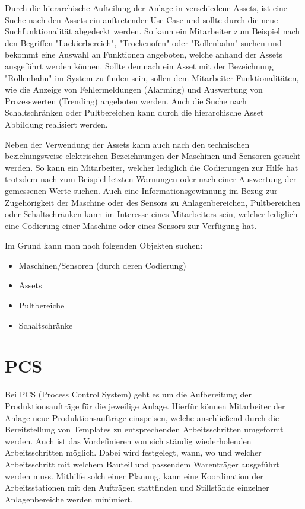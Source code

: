 Durch die hierarchische Aufteilung der Anlage in verschiedene Assets, ist eine Suche nach den Assets ein auftretender Use-Case und sollte durch die neue Suchfunktionalität abgedeckt werden. So kann ein Mitarbeiter zum Beispiel nach den Begriffen "Lackierbereich", "Trockenofen" oder "Rollenbahn" suchen und bekommt eine Auswahl an Funktionen angeboten, welche anhand der Assets ausgeführt werden können. Sollte demnach ein Asset mit der Bezeichnung "Rollenbahn" im System zu finden sein, sollen dem Mitarbeiter Funktionalitäten, wie die Anzeige von Fehlermeldungen (Alarming) und Auswertung von Prozesswerten (Trending) angeboten werden. Auch die Suche nach Schaltschränken oder Pultbereichen kann durch die hierarchische Asset Abbildung realisiert werden.

Neben der Verwendung der Assets kann auch nach den technischen beziehungsweise elektrischen Bezeichnungen der Maschinen und Sensoren gesucht werden. So kann ein Mitarbeiter, welcher lediglich die Codierungen zur Hilfe hat trotzdem nach zum Beispiel letzten Warnungen oder nach einer Auswertung der gemessenen Werte suchen. Auch eine Informationsgewinnung im Bezug zur Zugehörigkeit der Maschine oder des Sensors zu Anlagenbereichen, Pultbereichen oder Schaltschränken kann im Interesse eines Mitarbeiters sein, welcher lediglich eine Codierung einer Maschine oder eines Sensors zur Verfügung hat.

Im Grund kann man nach folgenden Objekten suchen:

\begin{itemize}
    \item Maschinen/Sensoren (durch deren Codierung)
    \item Assets
    \item Pultbereiche
    \item Schaltschränke
\end{itemize}

\section{PCS\label{sec3.3:unterpunkt-3}}
Bei PCS (Process Control System) geht es um die Aufbereitung der Produktionsaufträge für die jeweilige Anlage. Hierfür können Mitarbeiter der Anlage neue Produktionsaufträge einspeisen, welche anschließend durch die Bereitstellung von Templates zu entsprechenden Arbeitsschritten umgeformt werden. Auch ist das Vordefinieren von sich ständig wiederholenden Arbeitsschritten möglich. Dabei wird festgelegt, wann, wo und welcher Arbeitsschritt mit welchem Bauteil und passendem Warenträger ausgeführt werden muss. Mithilfe solch einer Planung, kann eine Koordination der Arbeitsstationen mit den Aufträgen stattfinden und Stillstände einzelner Anlagenbereiche werden minimiert.

